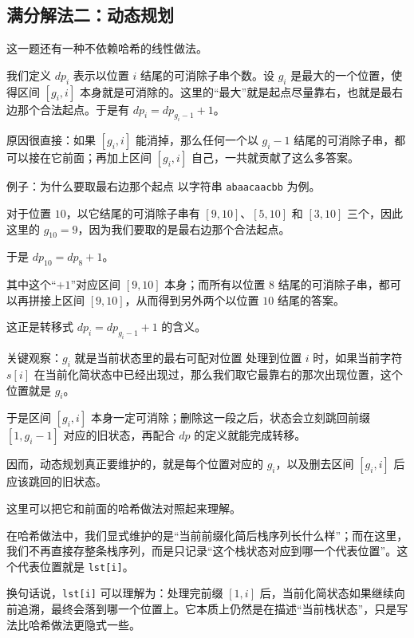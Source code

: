 \documentclass{book}
\newcommand{\code}[1]{\colorbox{codebg}{\texttt{#1}}}  %
\begin{document}
    \subsection{满分解法二：动态规划}

    这一题还有一种不依赖哈希的线性做法。

    我们定义 $dp_i$ 表示以位置 $i$ 结尾的可消除子串个数。设 $g_i$ 是最大的一个位置，使得区间 $[g_i,i]$ 本身就是可消除的。这里的“最大”就是起点尽量靠右，也就是最右边那个合法起点。于是有
    $dp_i = dp_{g_i-1} + 1$。

    原因很直接：如果 $[g_i,i]$ 能消掉，那么任何一个以 $g_i-1$ 结尾的可消除子串，都可以接在它前面；再加上区间 $[g_i,i]$ 自己，一共就贡献了这么多答案。

    \begin{examplebox}{例子：为什么要取最右边那个起点}
        以字符串 \texttt{abaacaacbb} 为例。

        对于位置 $10$，以它结尾的可消除子串有 $[9,10]$、$[5,10]$ 和 $[3,10]$ 三个，因此这里的 $g_{10}=9$，因为我们要取的是最右边那个合法起点。

        于是
        $dp_{10} = dp_8 + 1$。

        其中这个“$+1$”对应区间 $[9,10]$ 本身；而所有以位置 $8$ 结尾的可消除子串，都可以再拼接上区间 $[9,10]$，从而得到另外两个以位置 $10$ 结尾的答案。

        这正是转移式 $dp_i = dp_{g_i-1} + 1$ 的含义。
    \end{examplebox}

    \begin{keybox}{关键观察：$g_i$ 就是当前状态里的最右可配对位置}
        处理到位置 $i$ 时，如果当前字符 $s[i]$ 在当前化简状态中已经出现过，那么我们取它最靠右的那次出现位置，这个位置就是 $g_i$。

        于是区间 $[g_i,i]$ 本身一定可消除；删除这一段之后，状态会立刻跳回前缀 $[1,g_i-1]$ 对应的旧状态，再配合 $dp$ 的定义就能完成转移。
    \end{keybox}

    因而，动态规划真正要维护的，就是每个位置对应的 $g_i$，以及删去区间 $[g_i,i]$ 后应该跳回的旧状态。

    这里可以把它和前面的哈希做法对照起来理解。

    在哈希做法中，我们显式维护的是“当前前缀化简后栈序列长什么样”；而在这里，我们不再直接存整条栈序列，而是只记录“这个栈状态对应到哪一个代表位置”。这个代表位置就是 \code{lst[i]}。

    换句话说，\code{lst[i]} 可以理解为：处理完前缀 $[1,i]$ 后，当前化简状态如果继续向前追溯，最终会落到哪一个位置上。它本质上仍然是在描述“当前栈状态”，只是写法比哈希做法更隐式一些。
\end{document}
